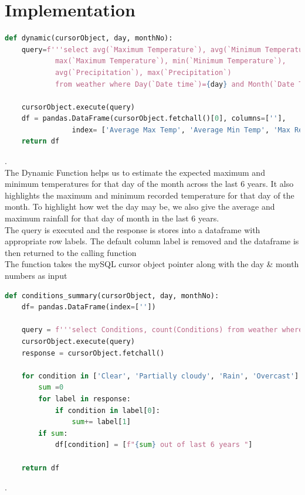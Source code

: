 \documentclass[12pt, a4paper]{article}
\begin{document}
\newpage
\section{Implementation}
\begin{lstlisting}[language=Python, breaklines=true]
def dynamic(cursorObject, day, monthNo):
    query=f'''select avg(`Maximum Temperature`), avg(`Minimum Temperature`),
            max(`Maximum Temperature`), min(`Minimum Temperature`),
            avg(`Precipitation`), max(`Precipitation`)
            from weather where Day(`Date time`)={day} and Month(`Date Time`)={monthNo};'''

    cursorObject.execute(query)
    df = pandas.DataFrame(cursorObject.fetchall()[0], columns=[''],
                index= ['Average Max Temp', 'Average Min Temp', 'Max Recorded Temp', 'Min Recorded Temp', 'Average Rainfall', 'Max Rainfall'])
    return df
\end{lstlisting}
.\\

The Dynamic Function helps us to estimate the expected maximum and minimum temperatures for that day of the month across the last 6 years. It also highlights the maximum and minimum recorded temperature for that day of the month. To highlight how wet the day may be, we also give the average and maximum rainfall for that day of month in the last 6 years.\\

The query is executed and the response is stores into a dataframe with appropriate row labels. The default column label is removed and the dataframe is then returned to the calling function\\

The function takes the mySQL cursor object pointer along with the day \& month numbers as input
\newpage
\begin{lstlisting}[language=Python, breaklines=true]
def conditions_summary(cursorObject, day, monthNo):
    df= pandas.DataFrame(index=[''])

    query = f'''select Conditions, count(Conditions) from weather where Day(`Date time`)={day} and Month(`Date Time`)={monthNo} group by Conditions'''
    cursorObject.execute(query)
    response = cursorObject.fetchall()

    for condition in ['Clear', 'Partially cloudy', 'Rain', 'Overcast']:
        sum =0
        for label in response:
            if condition in label[0]:
                sum+= label[1]
        if sum:
            df[condition] = [f"{sum} out of last 6 years "]
        
    return df
\end{lstlisting}
.\\
\end{document}
